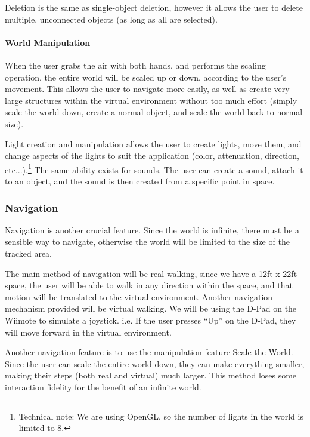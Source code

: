 Deletion is the same as single-object deletion, however it allows the user to delete multiple, unconnected objects (as long as all are selected).

\paragraph{World Manipulation}
When the user grabs the air with both hands, and performs the scaling operation, the entire world will be scaled up or down, according to the user's movement.
This allows the user to navigate more easily, as well as create very large structures within the virtual environment without too much effort (simply scale the world down, create a normal object, and scale the world back to normal size).

Light creation and manipulation allows the user to create lights, move them, and change aspects of the lights to suit the application (color, attenuation, direction, etc...).\footnote{Technical note: We are using OpenGL, so the number of lights in the world is limited to 8.}
The same ability exists for sounds.
The user can create a sound, attach it to an object, and the sound is then created from a specific point in space.

\subsubsection{Navigation}
\label{Design:Interaction:Navigation}
Navigation is another crucial feature.
Since the world is infinite, there must be a sensible way to navigate, otherwise the world will be limited to the size of the tracked area.

The main method of navigation will be real walking, since we have a 12ft x 22ft space, the user will be able to walk in any direction within the space, and that motion will be translated to the virtual environment.
Another navigation mechanism provided will be virtual walking.
We will be using the D-Pad on the Wiimote to simulate a joystick.
i.e. If the user presses ``Up'' on the D-Pad, they will move forward in the virtual environment.

Another navigation feature is to use the manipulation feature Scale-the-World.
Since the user can scale the entire world down, they can make everything smaller, making their steps (both real and virtual) much larger.
This method loses some interaction fidelity for the benefit of an infinite world.

